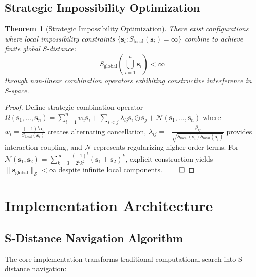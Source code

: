 \documentclass[11pt]{article}
\newtheorem{theorem}{Theorem}
\begin{document}
\subsection{Strategic Impossibility Optimization}

\begin{theorem}[Strategic Impossibility Optimization]
\label{thm:strategic_impossibility}
There exist configurations where local impossibility constraints $\{\mathbf{s}_i : S_{\text{local}}(\mathbf{s}_i) = \infty\}$ combine to achieve finite global S-distance:
\begin{equation}
S_{\text{global}}\left(\bigcup_{i=1}^n \mathbf{s}_i\right) < \infty
\end{equation}
through non-linear combination operators exhibiting constructive interference in S-space.
\end{theorem}

\begin{proof}
Define strategic combination operator $\Omega(\mathbf{s}_1, \ldots, \mathbf{s}_n) = \sum_{i=1}^n w_i \mathbf{s}_i + \sum_{i<j} \lambda_{ij} \mathbf{s}_i \odot \mathbf{s}_j + \mathcal{N}(\mathbf{s}_1, \ldots, \mathbf{s}_n)$ where $w_i = \frac{(-1)^i \alpha_i}{S_{\text{local}}(\mathbf{s}_i)}$ creates alternating cancellation, $\lambda_{ij} = -\frac{\beta_{ij}}{\sqrt{S_{\text{local}}(\mathbf{s}_i) S_{\text{local}}(\mathbf{s}_j)}}$ provides interaction coupling, and $\mathcal{N}$ represents regularizing higher-order terms. For $\mathcal{N}(\mathbf{s}_1, \mathbf{s}_2) = \sum_{k=3}^{\infty} \frac{(-1)^k}{2^k k^2} (\mathbf{s}_1 + \mathbf{s}_2)^k$, explicit construction yields $\|\mathbf{s}_{\text{global}}\|_{\mathcal{S}} < \infty$ despite infinite local components. $\qed$
\end{proof}

\section{Implementation Architecture}

\subsection{S-Distance Navigation Algorithm}

The core implementation transforms traditional computational search into S-distance navigation:
\end{document}
